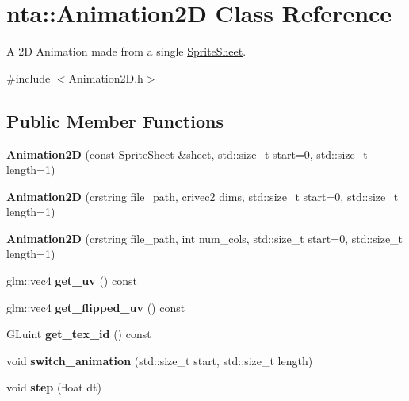 \hypertarget{classnta_1_1Animation2D}{}\section{nta\+:\+:Animation2D Class Reference}
\label{classnta_1_1Animation2D}


A 2D Animation made from a single \hyperlink{structnta_1_1SpriteSheet}{Sprite\+Sheet}.  




{\ttfamily \#include $<$Animation2\+D.\+h$>$}

\subsection*{Public Member Functions}
\begin{DoxyCompactItemize}
\item 
\mbox{\label{classnta_1_1Animation2D_a13c0e7e8f15507c6547500073efc5a10}} 
{\bfseries Animation2D} (const \hyperlink{structnta_1_1SpriteSheet}{Sprite\+Sheet} \&sheet, std\+::size\+\_\+t start=0, std\+::size\+\_\+t length=1)
\item 
\mbox{\label{classnta_1_1Animation2D_acfc8437b5b740228336b38461686fdd3}} 
{\bfseries Animation2D} (crstring file\+\_\+path, crivec2 dims, std\+::size\+\_\+t start=0, std\+::size\+\_\+t length=1)
\item 
\mbox{\label{classnta_1_1Animation2D_a6e3a9430ee7dc92e9f3acfe291c8311a}} 
{\bfseries Animation2D} (crstring file\+\_\+path, int num\+\_\+cols, std\+::size\+\_\+t start=0, std\+::size\+\_\+t length=1)
\item 
\mbox{\label{classnta_1_1Animation2D_af7373ff1020b685bd583ae63ba24de55}} 
glm\+::vec4 {\bfseries get\+\_\+uv} () const
\item 
\mbox{\label{classnta_1_1Animation2D_aa46a6c17839ad28c1f6b4c04537b237a}} 
glm\+::vec4 {\bfseries get\+\_\+flipped\+\_\+uv} () const
\item 
\mbox{\label{classnta_1_1Animation2D_a0ad6c0188e2b36f42caf1817537ec483}} 
G\+Luint {\bfseries get\+\_\+tex\+\_\+id} () const
\item 
\mbox{\label{classnta_1_1Animation2D_a06f041ee6aa98d79af06696095a5e95e}} 
void {\bfseries switch\+\_\+animation} (std\+::size\+\_\+t start, std\+::size\+\_\+t length)
\item 
\mbox{\label{classnta_1_1Animation2D_a3bc6f94232a04f3302ab5670ab46be44}} 
void {\bfseries step} (float dt)
\end{DoxyCompactItemize}
